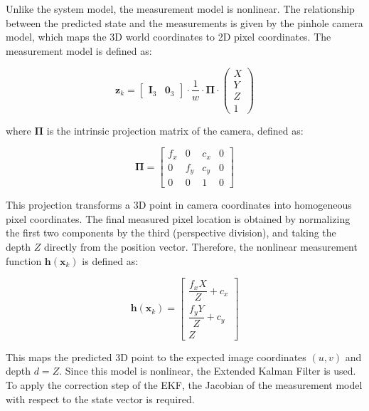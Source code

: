 Unlike the system model, the measurement model is nonlinear. The relationship between the predicted state and the measurements is given by the 
pinhole camera model, which maps the 3D world coordinates to 2D pixel coordinates. The measurement model is defined as:

\begin{equation}
  \mathbf{z}_k = \begin{bmatrix} \mathbf{I}_3 & \mathbf{0}_3 \end{bmatrix} \cdot \frac{1}{w} \cdot \boldsymbol{\Pi} \cdot 
  \begin{pmatrix}
  X \\
  Y \\
  Z \\
  1
  \end{pmatrix}
\end{equation}

where $\boldsymbol{\Pi}$ is the intrinsic projection matrix of the camera, defined as:

\begin{equation}
  \boldsymbol{\Pi} =
  \begin{bmatrix}
    f_x & 0 & c_x & 0 \\
    0 & f_y & c_y & 0 \\
    0 & 0 & 1 & 0
  \end{bmatrix}
\end{equation}

This projection transforms a 3D point in camera coordinates into homogeneous pixel coordinates. The final measured 
pixel location is obtained by normalizing the first two components by the third (perspective division), and taking 
the depth \( Z \) directly from the position vector. Therefore, the nonlinear measurement function 
$\mathbf{h}(\mathbf{x}_{k})$ is defined as:

\begin{equation}
  \mathbf{h}(\mathbf{x}_{k}) =
  \begin{bmatrix}
    \dfrac{f_x X}{Z} + c_x \\
    \dfrac{f_y Y}{Z} + c_y \\
    Z
  \end{bmatrix}
\end{equation}

This maps the predicted 3D point to the expected image coordinates $(u, v)$ and depth \( d = Z \). Since this model 
is nonlinear, the Extended Kalman Filter is used. To apply the correction step of the \gls{EKF}, the Jacobian of the 
measurement model with respect to the state vector is required.

